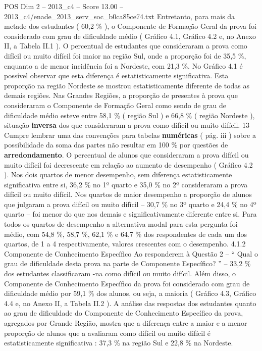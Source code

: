 \begin{textsample}{POS Dim 2 – 2013\_c4 – Score 13.00 – 2013\_c4/enade\_2013\_serv\_soc\_b0ca85ce74.txt}
Entretanto, para mais da metade dos estudantes ( 60,2 \% ), o Componente de Formação Geral da prova foi considerado com grau de dificuldade médio ( Gráfico 4.1, Gráfico 4.2 e, no Anexo II, a Tabela II.1 ).
O percentual de estudantes que consideraram a prova como difícil ou muito difícil foi maior na região Sul, onde a proporção foi de 35,5 \%, enquanto a de menor incidência foi a Nordeste, com 21,3 \%.
No Gráfico 4.1 é possível observar que esta diferença é estatisticamente significativa.
Esta proporção na região Nordeste se mostrou estatisticamente diferente de todas as demais regiões.
Nas Grandes Regiões, a proporção de presentes à prova que consideraram o Componente de Formação Geral como sendo de grau de dificuldade médio esteve entre 58,1 \% ( região Sul ) e 66,8 \% ( região Nordeste ), situação \textbf{inversa} dos que consideraram a prova como difícil ou muito difícil. 13 Cumpre lembrar uma das convenções para tabelas \textbf{numéricas} ( pág. iii ) sobre a possibilidade da soma das partes não resultar em 100 \% por questões de \textbf{arredondamento}.
O percentual de alunos que consideraram a prova difícil ou muito difícil foi decrescente em relação ao aumento de desempenho ( Gráfico 4.2 ).
Nos dois quartos de menor desempenho, sem diferença estatisticamente significativa entre si, 36,2 \% no 1º quarto e 35,0 \% no 2º consideraram a prova difícil ou muito difícil.
Nos quartos de maior desempenho a proporção de alunos que julgaram a prova difícil ou muito difícil – 30,7 \% no 3º quarto e 24,4 \% no 4º quarto – foi menor do que nos demais e significativamente diferente entre si.
Para todos os quartos de desempenho a alternativa modal para esta pergunta foi médio, com 54,8 \%, 58,7 \%, 62,1 \% e 64,7 \% dos respondentes de cada um dos quartos, de 1 a 4 respectivamente, valores crescentes com o desempenho. 4.1.2 Componente de Conhecimento Específico Ao responderem à Questão 2 – “ Qual o grau de dificuldade desta prova na parte de Componente Específico? ” – 33,2 \% dos estudantes classificaram -na como difícil ou muito difícil.
Além disso, o Componente de Conhecimento Específico da prova foi considerado com grau de dificuldade médio por 59,1 \% dos alunos, ou seja, a maioria ( Gráfico 4.3, Gráfico 4.4 e, no Anexo II, a Tabela II.2 ).
A análise das respostas dos estudantes quanto ao grau de dificuldade do Componente de Conhecimento Específico da prova, agregados por Grande Região, mostra que a diferença entre a maior e a menor proporção de alunos que a avaliaram como difícil ou muito difícil é estatisticamente significativa : 37,3 \% na região Sul e 22,8 \% na Nordeste.

\end{textsample}
